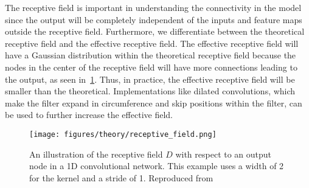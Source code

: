 The receptive field is important in understanding the connectivity in the model since the output will be completely independent of the inputs and feature maps outside the receptive field. Furthermore, we differentiate between the theoretical
receptive field and the effective receptive field. The effective receptive field
will have a Gaussian distribution within the theoretical receptive field because the nodes in the center of the receptive field will have more connections leading to the output, as seen in~\cref{fig:receptive_field}. Thus, in practice, the effective receptive field will be smaller than the theoretical. Implementations like dilated convolutions, which make the filter expand in circumference and skip positions within the filter, can be used to further increase the effective field.

\begin{figure}[!htb]
  \centering
  \texttt{[image: figures/theory/receptive\_field.png]}
  \caption{An illustration of the receptive field $D$ with respect to an output node in a 1D convolutional network. This example uses a width of 2 for the kernel and a stride of 1. Reproduced from~\cite{receptive_field_1D}}
  \label{fig:receptive_field}
\end{figure}



